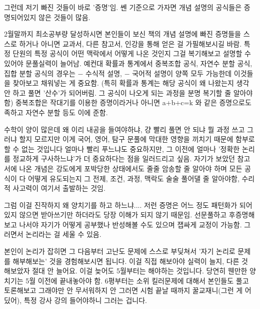 그런데 저기 빠진 것들이 바로 '증명'임.
쎈 기준으로 가자면 개념 설명의 공식들은 증명되어있지 않은 것들이 많음.
\vspace{5mm}

2월말까지 최소공부량 달성하시면
본인들이 보신 책의 개념 설명에 빠진 증명들을 스스로 하거나 아니면 교과서, 다른 참고서, 인강을 통해 얻은 걸 가필해보시길 바람.
특정 단원의 특정 공식이 어떤 맥락에서 어떻게 나온 것인지 그걸 복기해보고 설명할 수 있어야 문풀실력이 늘어남.
예컨대 확률과 통계에서 중복조합 공식, 자연수 분할 공식, 집합 분할 공식의 경우는
$-$ 수식적 설명, $-$ 국어적 설명이 양쪽 모두 가능한데 이것들을 찾아보고 채워넣는 게 중요함.
(특히 확률과 통계는 해당 공식이 왜 나왔는지 생각 안 하고 풀면 '산수'가 되어버림. 그 공식이 나오게 되는 과정을 분명 복기할 줄 알아야 함)
중복조합은 작대기를 이용한 증명이라거나 아니면 a+b+c=k 와 같은 증명으로도 족하고 자연수 분할 등도 이에 준함.
\vspace{5mm}

수학이 양이 많은데 왜 이리 내공을 들여야하냐, 걍 빨리 풀면 안 되냐 뭘 과정 쓰고 그러냐 할지 모르지만
이게 국어, 영어, 탐구 문풀에 막대한 영향을 끼치기 때문에 함부로 할 수 없는 것입니다
얼마나 빨리 푸느냐도 중요하지만, 그 이전에 얼마나 '정확한 논리를 정교하게 구사하느냐'가 더 중요하다는 점을 일러드리고 싶음.
자기가 보았던 참고서에 나온 개념은 강도에게 포박당한 상태에서도 줄줄 암송할 줄 알아야 하며
모든 공식이 다 어떻게 유도되는지 그 전제, 조건, 과정, 맥락도 술술 풀어댈 줄 알아야함, 수리적 사고력이 여기서 출발하는 것임.
\vspace{5mm}

그럼 이걸 진작하지 왜 양치기를 하고 하느냐....
저런 증명은 어느 정도 패턴화가 되어있지 않으면 받아쓰기만 하더라도 당장 이해가 되지 않기 때문임.
선문풀하고 후증명해보고 나서야 자기가 어떻게 공부했나 반성해볼 수도 있으며 잽싸게 교정이 가능함.
그러면서 논리라는 걸 세울 수 있음.
\vspace{5mm}

본인이 논리가 잡히면 그 다음부터 고난도 문제에 스스로 부딪쳐서 '자기 논리로 문제를 해부해보는' 것을 경험해보시면 됩니다.
이걸 직접 해보아야 실력이 늘지, 다른 것 해보았자 절대 안 늘어요.
이걸 늦어도 5월부터는 해야하는 것입니다. 당연히 웬만한 양치기는 5월 이전에 끝내놓아야 함.
6평부터는 소위 킬러문제에 대해서 본인들도 풀고 토론해보고 그래야만 안 무서워하지 안 그러면
시험 끝날 때까지 꿀교재니(그런 게 어딨어), 특정 강사 강의 들어야하니 그러는 겁니다.
\vspace{5mm}







